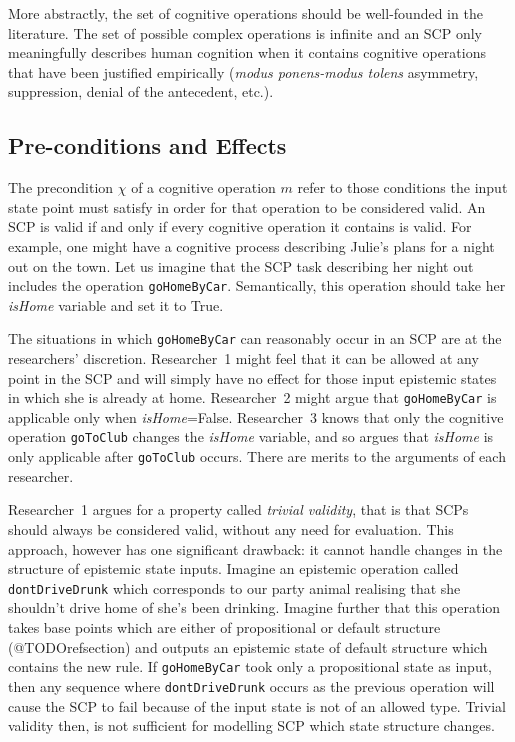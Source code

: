 More abstractly, the set of cognitive operations should be well-founded in the literature. The set of possible complex operations is infinite and an SCP only meaningfully describes human cognition when it contains cognitive operations that have been justified empirically (\textit{modus ponens-modus tolens} asymmetry, suppression, denial of the antecedent, etc.). 

\subsection{Pre-conditions and Effects} \label{ssec:precond}
The precondition $\chi$ of a cognitive operation $m$ refer to those conditions the input state point must satisfy in order for that operation to be considered valid. An SCP is valid if and only if every cognitive operation it contains is valid. For example, one might have a cognitive process describing Julie's plans for a night out on the town. Let us imagine that the SCP task describing her night out includes the operation \texttt{goHomeByCar}. Semantically, this operation should take her \textit{isHome} variable and set it to True.

The situations in which \texttt{goHomeByCar} can reasonably occur in an SCP are at the researchers' discretion. Researcher~1 might feel that it can be allowed at any point in the SCP and will simply have no effect for those input epistemic states in which she is already at home. Researcher~2 might argue that \texttt{goHomeByCar} is applicable only when \textit{isHome}=False. Researcher~3 knows that only the cognitive operation \texttt{goToClub} changes the \textit{isHome} variable, and so argues that \textit{isHome} is only applicable after \texttt{goToClub} occurs. There are merits to the arguments of each researcher.

Researcher~1 argues for a property called \textit{trivial validity}, that is that SCPs should always be considered valid, without any need for evaluation. This approach, however has one significant drawback: it cannot handle changes in the structure of epistemic state inputs. Imagine an epistemic operation called \texttt{dontDriveDrunk} which corresponds to our party animal realising that she shouldn't drive home of she's been drinking. Imagine further that this operation takes base points which are either of propositional or default structure (@TODOrefsection) and outputs an epistemic state of default structure which contains the new rule. If \texttt{goHomeByCar} took only a propositional state as input, then any sequence where \texttt{dontDriveDrunk} occurs as the previous operation will cause the SCP to fail because of the input state is not of an allowed type. Trivial validity then, is not sufficient for modelling SCP which state structure changes.

